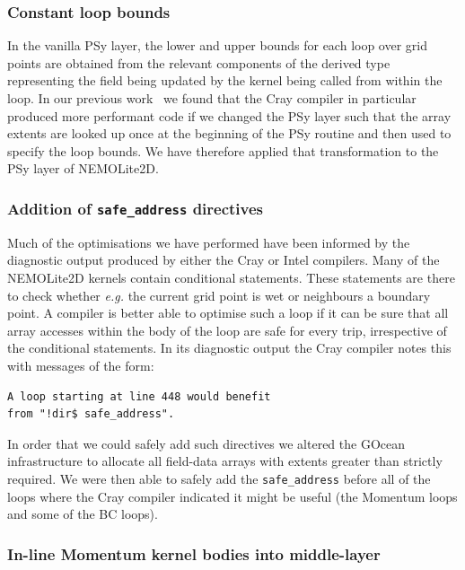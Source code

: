 \documentclass[gmd, manuscript]{copernicus}
\begin{document}
\subsubsection{Constant loop bounds}

In the vanilla {PS}y layer, the lower and upper bounds for each loop
over grid points are obtained from the relevant components of the
derived type representing the field being updated by the kernel being
called from within the loop. In our previous
work~\citep{shallow_psykal} we found that the Cray compiler in
particular produced more performant code if we changed the PSy layer
such that the array extents are looked up once at the beginning of the
PSy routine and then used to specify the loop bounds. We have therefore
applied that transformation to the PSy layer of NEMOLite2D.

\subsubsection{Addition of \texttt{safe\_address} directives}
\label{sec_safe_address}

Much of the optimisations we have performed have been informed by the
diagnostic output produced by either the Cray or Intel compilers. Many
of the NEMOLite2D kernels contain conditional statements. These
statements are there to check whether \textit{e.g.} the current grid
point is wet or neighbours a boundary point. A compiler is better able
to optimise such a loop if it can be sure that all array accesses
within the body of the loop are safe for every trip, irrespective of
the conditional statements. In its diagnostic output the Cray compiler
notes this with messages of the form:
\begin{verbatim}
A loop starting at line 448 would benefit 
from "!dir$ safe_address".
\end{verbatim}
In order that we could safely add such directives we altered the
GOcean infrastructure to allocate all field-data arrays with extents
greater than strictly required.  We were then able to safely add the
\texttt{safe\_address} before all of the loops where the Cray compiler
indicated it might be useful (the Momentum loops and some of the BC
loops).

\subsubsection{In-line Momentum kernel bodies into middle-layer}
\label{sec_inline_mom}
\end{document}
